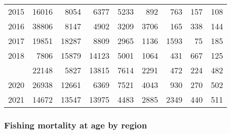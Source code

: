 \documentclass[
]{article}
\begin{document}
\begin{longtable}[t]{lrrrrrrrr}
2015 & 16016 & 8054 & 6377 & 5233 & 892 & 763 & 157 & 108\\
2016 & 38806 & 8147 & 4902 & 3209 & 3706 & 165 & 338 & 144\\
2017 & 19851 & 18287 & 8809 & 2965 & 1136 & 1593 & 75 & 185\\
2018 & 7806 & 15879 & 14123 & 5001 & 1064 & 431 & 667 & 125\\
\addlinespace
2019 & 22148 & 5827 & 13815 & 7614 & 2291 & 472 & 224 & 482\\
2020 & 26938 & 12661 & 6369 & 7521 & 4043 & 930 & 270 & 502\\
2021 & 14672 & 13547 & 13975 & 4483 & 2885 & 2349 & 440 & 511\\*
\end{longtable}

\hypertarget{fishing-mortality-at-age-by-region}{%
\subsubsection{Fishing mortality at age by
region}\label{fishing-mortality-at-age-by-region}}
\end{document}
